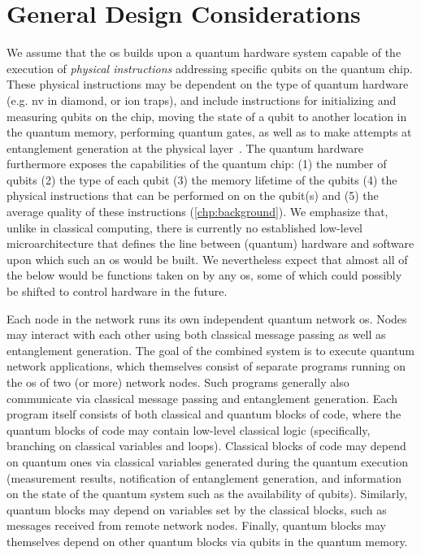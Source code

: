 \section{General Design Considerations}
\label{sec:arch:considerations}

We assume that the \acrshort{os} builds upon a quantum hardware system capable of the execution of
\emph{physical instructions} addressing specific qubits on the quantum chip. These physical
instructions may be dependent on the type of quantum hardware (e.g. \acrshort{nv} in diamond, or ion
traps), and include instructions for initializing and measuring qubits on the chip, moving the state
of a qubit to another location in the quantum memory, performing quantum gates, as well as to make
attempts at entanglement generation at the physical layer~\cite{pompili_2022_experimental}. The
quantum hardware furthermore exposes the capabilities of the quantum chip: (1) the number of qubits
(2) the type of each qubit (3) the memory lifetime of the qubits (4) the physical instructions that
can be performed on on the qubit(s) and (5) the average quality of these instructions
(\cref{chp:background}). We emphasize that, unlike in classical computing, there is currently no
established low-level microarchitecture that defines the line between (quantum) hardware and
software upon which such an \acrshort{os} would be built. We nevertheless expect that almost all of
the below would be functions taken on by any \acrshort{os}, some of which could possibly be shifted
to control hardware in the future.

Each node in the network runs its own independent quantum network \acrshort{os}. Nodes may interact
with each other using both classical message passing as well as entanglement generation. The goal of
the combined system is to execute quantum network applications, which themselves consist of separate
programs running on the \acrshort{os} of two (or more) network nodes. Such programs generally also
communicate via classical message passing and entanglement generation. Each program itself consists
of both classical and quantum blocks of code, where the quantum blocks of code may contain low-level
classical logic (specifically, branching on classical variables and loops). Classical blocks of code
may depend on quantum ones via classical variables generated during the quantum execution
(measurement results, notification of entanglement generation, and information on the state of the
quantum system such as the availability of qubits). Similarly, quantum blocks may depend on
variables set by the classical blocks, such as messages received from remote network nodes. Finally,
quantum blocks may themselves depend on other quantum blocks via qubits in the quantum memory.

